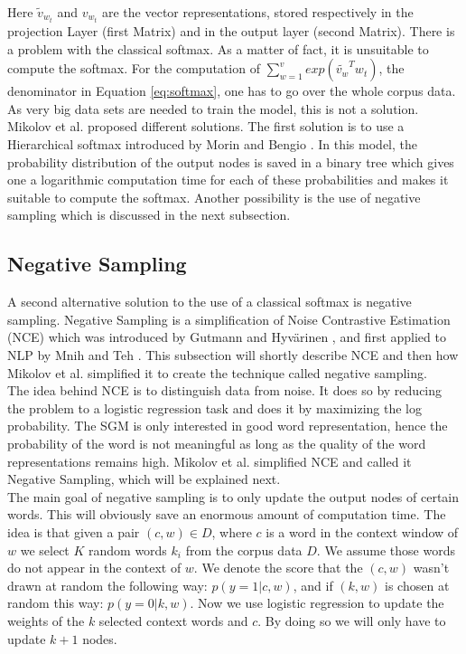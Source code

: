 \documentclass[conference]{IEEEtran}
\begin{document}
Here $\tilde{v}_{w_t}$ and $ v_{w_t}$ are the vector representations, stored respectively in the projection Layer (first Matrix) and in the output layer (second Matrix). There is a problem with the classical softmax. As a matter of fact, it is unsuitable to compute the softmax. For the computation of $\sum_{w=1}^v exp(\tilde{v_w}^T w_t)$, the denominator in Equation \ref{eq:softmax}, one has to go over the whole corpus data. As very big data sets are needed to train the model, this is not a solution. Mikolov et al. \cite{mikolov2} proposed different solutions. The first solution is to use a Hierarchical softmax introduced by Morin and Bengio \cite{hsoftmax}. In this model, the probability distribution of the output nodes is saved in a binary tree which gives one a logarithmic computation time for each of these probabilities and makes it suitable to compute the softmax. Another possibility is the use of negative sampling which is discussed in the next subsection.

\subsection{Negative Sampling}
A second alternative solution to the use of a classical softmax is negative sampling. Negative Sampling is a simplification of Noise Contrastive Estimation (NCE) which was introduced by Gutmann and Hyv{\"a}rinen \cite{nce-original}, and first applied to NLP by Mnih and Teh \cite{mnih}. This subsection will shortly describe NCE and then how Mikolov et al. \cite{mikolov2} simplified it to create the technique called negative sampling. \\ The idea behind NCE is to distinguish data from noise. It does so by reducing the problem to a logistic regression task and does it by maximizing the log probability. The SGM is only interested in good word representation, hence the probability of the word is not meaningful as long as the quality of the word representations remains high. Mikolov et al. \cite{mikolov2} simplified NCE and called it Negative Sampling, which will be explained next.\\
The main goal of negative sampling is to only update the output nodes of certain words. This will obviously save an enormous amount of computation time. The idea is that given a pair $(c,w) \in D$, where $c$ is a word in the context window of $w$ we select $K$ random words $k_i$ from the corpus data $D$. We assume those words do not appear in the context of $w$. We denote the score that the $(c,w)$ wasn't drawn at random the following way: $p(y=1|c,w)$, and if $(k,w) $ is chosen at random this way: $p(y=0|k,w)$. Now we use logistic regression to update the weights of the $k$ selected context words and $c$. By doing so we will only have to update $k+1$ nodes.
\end{document}
